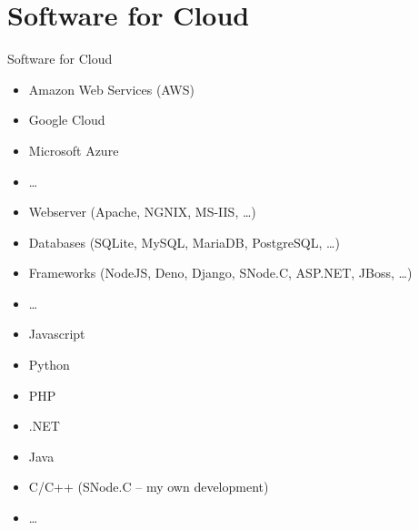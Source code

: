 ﻿\section[nosectionpage]{Software for Cloud}

\begin{frame}{Software for Cloud}
  \begin{description}[Languages]
    \item[Systems]
    \begin{itemize}
      \item \alert<2>{Amazon Web Services (AWS)}
      \item Google Cloud
      \item Microsoft Azure
      \item \ldots
    \end{itemize}
    \item[Tools]
    \begin{itemize}
      \item Webserver (Apache, NGNIX, MS-IIS, \ldots)
      \item Databases (SQLite, MySQL, \alert<2>{MariaDB}, PostgreSQL, \ldots)
      \item Frameworks (\alert<2>{NodeJS}, Deno, Django, \alert<2>{SNode.C}, ASP.NET, JBoss, \ldots)
      \item \ldots
    \end{itemize}
    \item[Languages]
    \begin{itemize}
      \item \alert<2>{Javascript}
      \item Python
      \item PHP
      \item .NET
      \item Java
      \item \alert<2>{C/C++ (SNode.C -- my own development)}
      \item \ldots
    \end{itemize}
  \end{description}
\end{frame}
